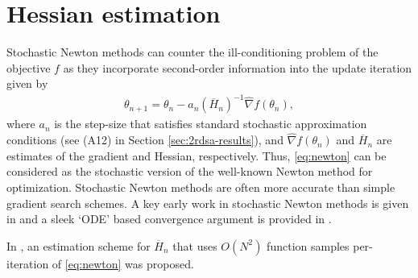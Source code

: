 \section{Hessian estimation}\label{sec:hesest}
Stochastic Newton methods can counter the ill-conditioning problem of the objective $f$ as they incorporate second-order information into the update iteration given by   
\begin{align}
\label{eq:newton}
\theta_{n+1} = \theta_n - a_n (\overline H_n)^{-1}\widehat\nabla f(\theta_n), 
\end{align}
where $a_n$ is the step-size that satisfies standard stochastic approximation conditions (see (A12) in Section \ref{sec:2rdsa-results}), and $\widehat\nabla f(\theta_n)$ and $\overline H_n$ are estimates of the gradient and Hessian, respectively. Thus, \eqref{eq:newton} can be considered as  the stochastic version of the well-known Newton method for optimization. Stochastic Newton methods are often more accurate than simple gradient search schemes. A key early work in stochastic Newton methods  is given in \cite{anbar1978stochastic} and a sleek `ODE' based convergence argument is provided in \cite{smale1976convergent}.

In \cite{fabian}, an estimation scheme for $\overline H_n$ that uses $O(N^2)$ function samples per-iteration of \eqref{eq:newton} was proposed.

